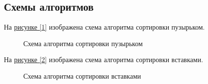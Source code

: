 \documentclass{article}
\begin{document}
	 	\subsection{Схемы алгоритмов}
	 	На \hyperref[bubble]{рисунке [\ref{bubble}]} изображена схема алгоритма сортировки пузырьком.
	\begin{figure}[h!]
		\caption{Схема алгоритма сортировки пузырьком}
		\label{bubble}
	\end{figure}
	\newpage
	На \hyperref[insert]{рисунке [\ref{insert}]} изображена схема алгоритма сортировки вставками.
	\begin{figure}[h!]
		\caption{Схема алгоритма сортировки вставками}
		\label{insert}
	\end{figure}
\end{document}
